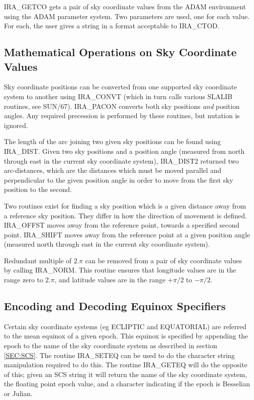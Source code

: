 IRA\_GETCO gets a pair of sky coordinate values from the ADAM environment 
using the ADAM parameter system. Two parameters are used, one for each value.
For each, the user gives a string in a format acceptable to IRA\_CTOD.

\subsection {Mathematical Operations on Sky Coordinate Values}
Sky coordinate positions can be converted from one supported sky coordinate
system to another using IRA\_CONVT (which in turn calls various SLALIB routines,
see SUN/67). IRA\_PACON converts both sky positions {\em and} position angles. 
Any required precession is performed by these routines, but nutation is ignored.

The length of the arc joining two given sky positions can be found using
IRA\_DIST. Given two sky positions and a position angle (measured from north
through east in the current sky coordinate system), IRA\_DIST2 returned two
arc-distances, which are the distances which must be moved parallel and
perpendicular to the given position angle in order to move from the first sky
position to the second. 

Two routines exist for finding a sky position which is a given distance away
from a reference sky position. They differ in how the direction of movement is
defined. IRA\_OFFST moves away from the reference point, towards a specified
second point. IRA\_SHIFT moves away from the reference point at a given position
angle (measured north through east in the current sky coordinate system). 

Redundant multiple of $2.\pi$ can be removed from a pair of sky coordinate 
values by calling IRA\_NORM. This routine ensures that longitude values are in 
the range zero to $2.\pi$, and latitude values are in the range $+\pi/2$ to 
$-\pi/2$.

\subsection {Encoding and Decoding Equinox Specifiers}
Certain sky coordinate systems (eg ECLIPTIC and EQUATORIAL) are referred to the
mean equinox of a given epoch. This equinox is specified by appending the epoch
to the name of the sky coordinate system as described in section \ref {SEC:SCS}.
The routine IRA\_SETEQ can be used to do the character string manipulation
required to do this. The routine IRA\_GETEQ will do the opposite of this; given
an SCS string it will return the name of the sky coordinate system, the floating
point epoch value, and a character indicating if the epoch is Besselian or
Julian. 

